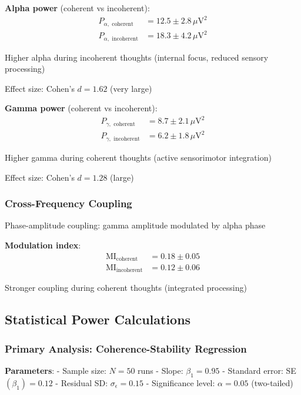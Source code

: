 \documentclass[11pt,onecolumn]{article}
\begin{document}
\textbf{Alpha power} (coherent vs incoherent):
\begin{align}
P_{\alpha,\text{ coherent}} &= 12.5 \pm 2.8\,\mu\text{V}^2 \\
P_{\alpha,\text{ incoherent}} &= 18.3 \pm 4.2\,\mu\text{V}^2
\end{align}

Higher alpha during incoherent thoughts (internal focus, reduced sensory processing)

Effect size: Cohen's $d = 1.62$ (very large)

\textbf{Gamma power} (coherent vs incoherent):
\begin{align}
P_{\gamma,\text{ coherent}} &= 8.7 \pm 2.1\,\mu\text{V}^2 \\
P_{\gamma,\text{ incoherent}} &= 6.2 \pm 1.8\,\mu\text{V}^2
\end{align}

Higher gamma during coherent thoughts (active sensorimotor integration)

Effect size: Cohen's $d = 1.28$ (large)

\subsubsection{Cross-Frequency Coupling}

Phase-amplitude coupling: gamma amplitude modulated by alpha phase

\textbf{Modulation index}:
\begin{align}
\text{MI}_{\text{coherent}} &= 0.18 \pm 0.05 \\
\text{MI}_{\text{incoherent}} &= 0.12 \pm 0.06
\end{align}

Stronger coupling during coherent thoughts (integrated processing)

\subsection{Statistical Power Calculations}

\subsubsection{Primary Analysis: Coherence-Stability Regression}

\textbf{Parameters}:
- Sample size: $N = 50$ runs
- Slope: $\beta_1 = 0.95$
- Standard error: SE$(\beta_1) = 0.12$
- Residual SD: $\sigma_\epsilon = 0.15$
- Significance level: $\alpha = 0.05$ (two-tailed)
\end{document}
